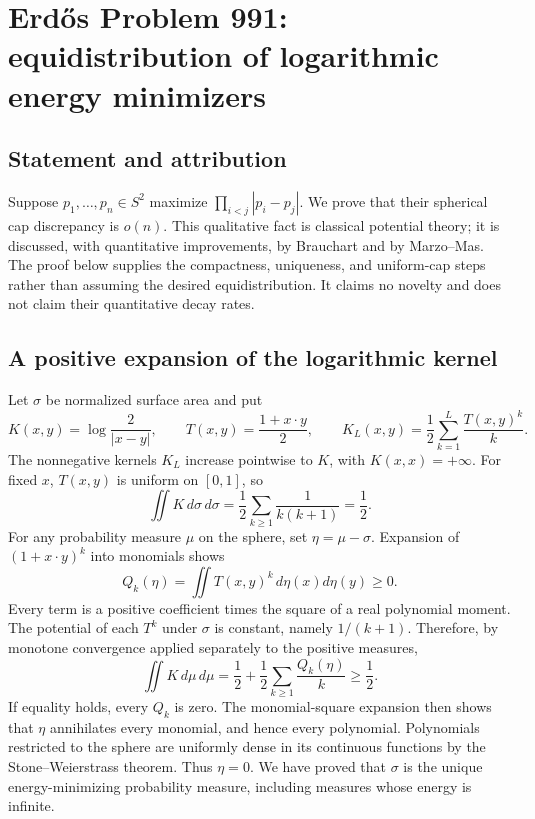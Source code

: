 \section*{Erd\H{o}s Problem 991: equidistribution of logarithmic energy minimizers}
\subsection*{Statement and attribution}
Suppose $p_1,\ldots,p_n\in S^2$ maximize $\prod_{i<j}|p_i-p_j|$.
We prove that their spherical cap discrepancy is $o(n)$.
This qualitative fact is classical potential theory; it is discussed, with quantitative improvements, by Brauchart and by Marzo--Mas. The proof below supplies the compactness, uniqueness, and uniform-cap steps rather than assuming the desired equidistribution. It claims no novelty and does not claim their quantitative decay rates.

\subsection*{A positive expansion of the logarithmic kernel}
Let $\sigma$ be normalized surface area and put
\[
 K(x,y)=\log\frac2{|x-y|},\qquad
 T(x,y)=\frac{1+x\cdot y}{2},\qquad
 K_L(x,y)=\frac12\sum_{k=1}^{L}\frac{T(x,y)^k}{k}.
\]
The nonnegative kernels $K_L$ increase pointwise to $K$, with $K(x,x)=+\infty$.
For fixed $x$, $T(x,y)$ is uniform on $[0,1]$, so
\[
 \iint K\,d\sigma\,d\sigma
 =\frac12\sum_{k\ge1}\frac1{k(k+1)}=\frac12.
 \tag{1}
\]
For any probability measure $\mu$ on the sphere, set $\eta=\mu-\sigma$.
Expansion of $(1+x\cdot y)^k$ into monomials shows
\[
 Q_k(\eta)=\iint T(x,y)^k\,d\eta(x)d\eta(y)\ge0.
\]
Every term is a positive coefficient times the square of a real polynomial moment. The potential of each $T^k$ under $\sigma$ is constant, namely $1/(k+1)$. Therefore, by monotone convergence applied separately to the positive measures,
\[
 \iint K\,d\mu\,d\mu
 =\frac12+\frac12\sum_{k\ge1}\frac{Q_k(\eta)}{k}\ge\frac12.
 \tag{2}
\]
If equality holds, every $Q_k$ is zero. The monomial-square expansion then shows that $\eta$ annihilates every monomial, and hence every polynomial. Polynomials restricted to the sphere are uniformly dense in its continuous functions by the Stone--Weierstrass theorem. Thus $\eta=0$. We have proved that $\sigma$ is the unique energy-minimizing probability measure, including measures whose energy is infinite.

